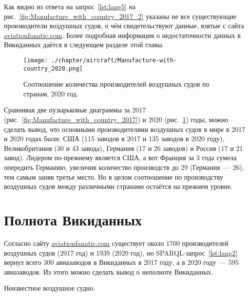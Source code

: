 Как видно из ответа на запрос~\ref{lst:lang5} на рис.~\ref{fig:Manufacture_with_country_2017_2} указаны не все существующие производители воздушных судов, о чём свидетельствуют данные, взятые с сайта \href{https://www.aviationfanatic.com/}{aviationfanatic.com}. Более подробная информация о недостаточности данных в Викиданных даётся в следующем разделе этой главы. 

\begin{figure}[h!]
\centering
	\texttt{[image: ./chapter/aircraft/Manufacture-with-country\_2020.png]}
	\caption{Соотношение количества производителей воздушных судов по странам, 2020 год.}
	\label{fig:Manufacture_with_country_2020}
\end{figure}

\label{fig:Manufacture_with_country_2017_2}

Сравнивая две пузырьковые диаграммы за 2017 (рис.~\ref{fig:Manufacture_with_country_2017}) и 2020 (рис.~\ref{fig:Manufacture_with_country_2020}) годы, можно сделать вывод, что основными производителями воздушных судов в мире 
в 2017 и 2020 годах были: США (115 заводов в 2017 и 135 заводов в 2020 году), Великобритания (30 и 43 завода), Германия (17 и 26 заводов) и Россия (17 и 21 завод). Лидером по-прежнему является США, а вот Франция за 3 года сумела опередить Германию, увеличив количество производств до 29 (Германия~--- 26), тем самым заняв третье место. Но в целом соотношение по производству воздушных судов между различными странами остаётся на прежнем уровне.

\section{Полнота Викиданных}

Согласно сайту \href{https://www.aviationfanatic.com/}{aviationfanatic.com} существует около \num{1700} производителей воздушных судов\cite{count_of_aircraft_manufactures} (2017 год) и \num{1939} (2020 год), но SPARQL-запрос~\ref{lst:lang2} вернул всего 300 авиазаводов в Викиданных в 2017 году, а в 2020 году~--- 595 авиазаводов. Из этого можно сделать вывод о неполноте Викиданных.  

\label{aircraft_question_5}


\begin{marginfigure}[0.0cm]
{
\setlength{\fboxsep}{0pt}%
\setlength{\fboxrule}{1pt}%
%
}
  \caption{Неизвестное воздушное судно.}%
  \label{fig:airship_question_aircraft}%
\end{marginfigure}

